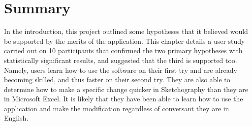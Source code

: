 \section{Summary}
In the introduction, this project outlined some hypotheses that it believed would be supported by the merits of the application. This chapter details a user study carried out on 10 participants that confirmed the two primary hypotheses with statistically significant results, and suggested that the third is supported too. Namely, users learn how to use the software on their first try and are already becoming skilled, and thus faster on their second try. They are also able to determine how to make a specific change quicker in Sketchography than they are in Microsoft Excel. It is likely that they have been able to learn how to use the application and make the modification regardless of conversant they are in English.